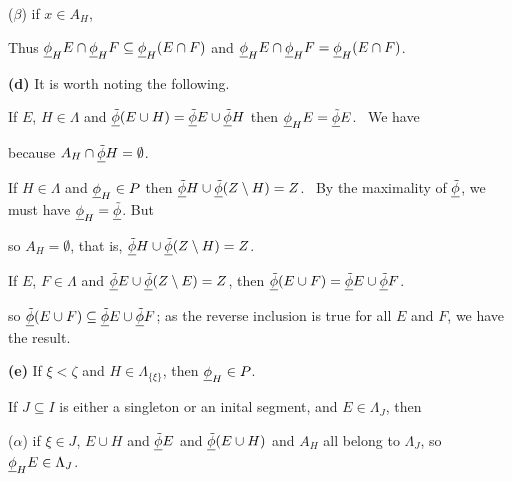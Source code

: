 {\qquad($\beta$) if $x\in A_H$,


\noindent Thus ${\underline{\phi}}_H E\cap{\underline{\phi}}_H F\subseteq{\underline{\phi}}_H(E\cap F)$
and ${\underline{\phi}}_H E\cap{\underline{\phi}}_H F={\underline{\phi}}_H(E\cap F)$.\ \Qed

\medskip

{\bf (d)}
It is worth noting the following.

\medskip

 If $E$, $H\in\Lambda$ and $\underline{\tilde\phi}(E\cup H)=\underline{\tilde\phi}
E\cup\underline{\tilde\phi} H$ then ${\underline{\phi}}_HE=\underline{\tilde\phi} E$.   \Prf\ We have


\noindent because $A_H\cap\underline{\tilde\phi} H=\emptyset$.\ \Qed


 If $H\in\Lambda$ and ${\underline{\phi}}_H\in P$ then $\underline{\tilde\phi}
H\cup\underline{\tilde\phi}(Z\setminus H)=Z$.   \Prf\ By the maximality of $\underline{\tilde\phi}$,
we must have ${\underline{\phi}}_H=\underline{\tilde\phi}$.   But


\noindent so $A_H=\emptyset$, that is, $\underline{\tilde\phi} H\cup\underline{\tilde\phi}(Z\setminus
H)=Z$.\ \Qed

\medskip

 If $E$, $F\in\Lambda$ and
$\underline{\tilde\phi} E\cup\underline{\tilde\phi}(Z\setminus E)=Z$, then
$\underline{\tilde\phi}(E\cup F)=\underline{\tilde\phi} E\cup\underline{\tilde\phi} F$.   \Prf\


\noindent so  $\underline{\tilde\phi}(E\cup F)\subseteq\underline{\tilde\phi} E\cup\underline{\tilde\phi} F$;  as the
reverse inclusion is true for all $E$ and $F$, we have the result.
\Qed

\medskip

{\bf (e)} If $\xi<\zeta$ and $H\in\Lambda_{\{\xi\}}$, then
${\underline{\phi}}_H\in P$.

\medskip

 If $J\subseteq I$ is either a singleton or an inital
segment, and $E\in\Lambda_J$, then

\qquad($\alpha$) if $\xi\in J$, $E\cup H$ and $\underline{\tilde\phi} E$ and
$\underline{\tilde\phi}(E\cup H)$ and $A_H$ all belong to $\Lambda_J$, so
${\underline{\phi}}_HE\in\Lambda_J$.

}
